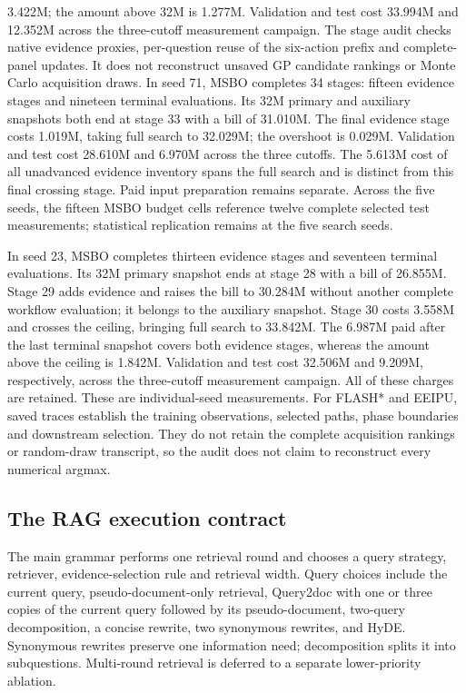 3.422M; the amount above 32M is 1.277M. Validation and test cost 33.994M
and 12.352M across the three-cutoff measurement campaign. The stage audit
checks native evidence proxies, per-question reuse of the six-action prefix
and complete-panel updates. It does not reconstruct unsaved GP candidate
rankings or Monte Carlo acquisition draws.
In seed 71, MSBO completes 34 stages: fifteen evidence stages and
nineteen terminal evaluations. Its 32M primary and auxiliary snapshots
both end at stage 33 with a bill of 31.010M. The final evidence stage
costs 1.019M, taking full search to 32.029M; the overshoot is 0.029M.
Validation and test cost 28.610M and 6.970M across the three cutoffs.
The 5.613M cost of all unadvanced evidence inventory spans the full search
and is distinct from this final crossing stage. Paid input preparation
remains separate. Across the five seeds, the fifteen MSBO budget cells
reference twelve complete selected test measurements; statistical
replication remains at the five search seeds.

In seed 23, MSBO completes thirteen evidence stages and seventeen terminal
evaluations. Its 32M primary snapshot ends at stage 28 with a bill of
26.855M. Stage 29 adds evidence and raises the bill to 30.284M without
another complete workflow evaluation; it belongs to the auxiliary snapshot.
Stage 30 costs 3.558M and crosses the ceiling, bringing full search to
33.842M. The 6.987M paid after the last terminal snapshot covers both
evidence stages, whereas the amount above the ceiling is 1.842M.
Validation and test cost 32.506M and 9.209M, respectively, across the
three-cutoff measurement campaign. All of these charges are retained.
These are individual-seed measurements.
For FLASH* and EEIPU, saved traces establish the training observations, selected paths, phase
boundaries and downstream selection. They do not retain the complete
acquisition rankings or random-draw transcript, so the audit does not claim
to reconstruct every numerical argmax.

\subsection{The RAG execution contract}
The main grammar performs one retrieval round and chooses a query strategy,
retriever, evidence-selection rule and retrieval width. Query choices include the current query,
pseudo-document-only retrieval, Query2doc with one or three copies of the
current query followed by its pseudo-document, two-query decomposition,
a concise rewrite, two synonymous rewrites, and HyDE. Synonymous rewrites
preserve one information need; decomposition splits it into subquestions.
Multi-round retrieval is deferred to a separate lower-priority ablation.

